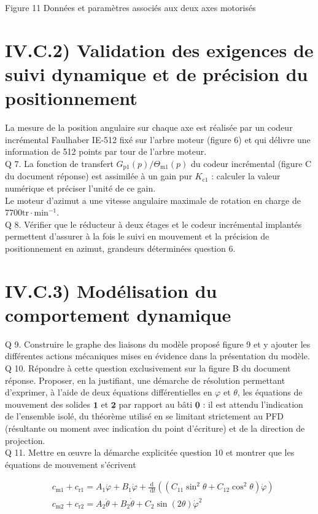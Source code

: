 \documentclass[10pt]{article}
\begin{document}
Figure 11 Données et paramètres associés aux deux axes motorisés

\section*{IV.C.2) Validation des exigences de suivi dynamique et de précision du positionnement}
La mesure de la position angulaire sur chaque axe est réalisée par un codeur incrémental Faulhaber IE-512 fixé sur l'arbre moteur (figure 6) et qui délivre une information de 512 points par tour de l'arbre moteur.\\
Q 7. La fonction de transfert $G_{\mathrm{p} 1}(p) / \Theta_{\mathrm{m} 1}(p)$ du codeur incrémental (figure C du document réponse) est assimilée à un gain pur $K_{\mathrm{c} 1}$ : calculer la valeur numérique et préciser l'unité de ce gain.\\
Le moteur d'azimut a une vitesse angulaire maximale de rotation en charge de $7700 \mathrm{tr} \cdot \mathrm{min}^{-1}$.\\
Q 8. Vérifier que le réducteur à deux étages et le codeur incrémental implantés permettent d'assurer à la fois le suivi en mouvement et la précision de positionnement en azimut, grandeurs déterminées question 6.

\section*{IV.C.3) Modélisation du comportement dynamique}
Q 9. Construire le graphe des liaisons du modèle proposé figure 9 et y ajouter les différentes actions mécaniques mises en évidence dans la présentation du modèle.\\
Q 10. Répondre à cette question exclusivement sur la figure B du document réponse. Proposer, en la justifiant, une démarche de résolution permettant d'exprimer, à l'aide de deux équations différentielles en $\varphi$ et $\theta$, les équations de mouvement des solides $\underline{\mathbf{1}}$ et $\underline{\mathbf{2}}$ par rapport au bâti $\underline{\mathbf{0}}$ : il est attendu l'indication de l'ensemble isolé, du théorème utilisé en se limitant strictement au PFD (résultante ou moment avec indication du point d'écriture) et de la direction de projection.\\
Q 11. Mettre en œuvre la démarche explicitée question 10 et montrer que les équations de mouvement s'écrivent

$$
\begin{aligned}
& c_{\mathrm{m} 1}+c_{\mathrm{r} 1}=A_{1} \ddot{\varphi}+B_{1} \dot{\varphi}+\frac{\mathrm{d}}{\mathrm{~d} t}\left(\left(C_{11} \sin ^{2} \theta+C_{12} \cos ^{2} \theta\right) \dot{\varphi}\right) \\
& c_{\mathrm{m} 2}+c_{\mathrm{r} 2}=A_{2} \ddot{\theta}+B_{2} \dot{\theta}+C_{2} \sin (2 \theta) \dot{\varphi}^{2}
\end{aligned}
$$
\end{document}
